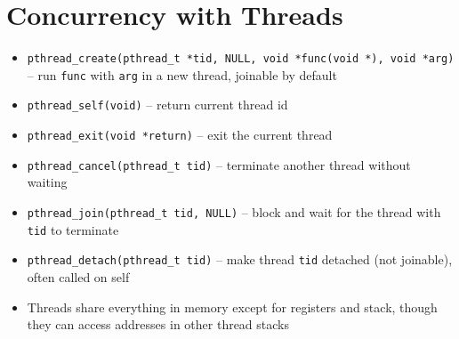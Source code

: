 \documentclass[twocolumn]{article}
\renewcommand{\tt}[1]{\texttt{#1}}
\begin{document}
\section{Concurrency with Threads}
\begin{itemize}[noitemsep]
\item \tt{pthread\_create(pthread\_t *tid, NULL, void *func(void *), void *arg)} -- run \tt{func} with \tt{arg} in a new thread, joinable by default
\item \tt{pthread\_self(void)} -- return current thread id
\item \tt{pthread\_exit(void *return)} -- exit the current thread
\item \tt{pthread\_cancel(pthread\_t tid)} -- terminate another thread without waiting
\item \tt{pthread\_join(pthread\_t tid, NULL)} -- block and wait for the thread with \tt{tid} to terminate
\item \tt{pthread\_detach(pthread\_t tid)} -- make thread \tt{tid} detached (not joinable), often called on self
\item Threads share everything in memory except for registers and stack, though they can access addresses in other thread stacks
\end{itemize}

\vfill
\end{document}
